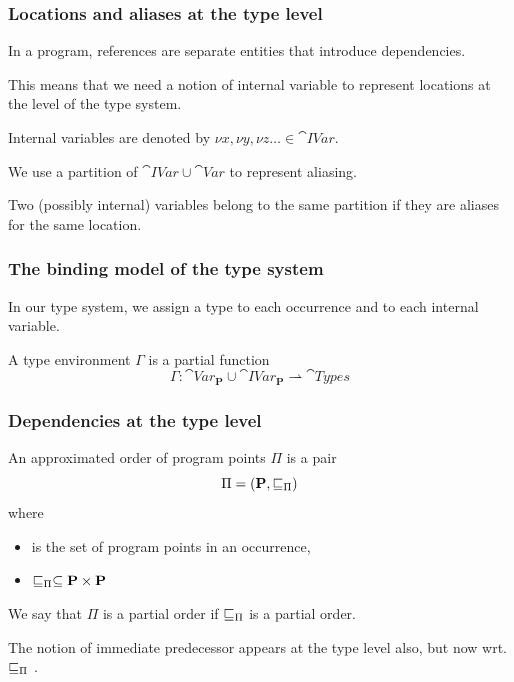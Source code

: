 \documentclass[aspectratio=169]{beamer}
\begin{document}
 \begin{frame}
   \frametitle{Locations and aliases at the type level}

In a program, references are separate entities that introduce
dependencies.

This means that we need a notion of \alert{internal variable} to
represent locations at the level of the type system.

Internal variables are denoted by
$\nu x,\nu y, \nu z \ldots \in\cat{IVar}$.

We use a partition of $\cat{IVar} \cup \cat{Var}$ to represent
aliasing.

Two (possibly internal) variables belong to the same partition if they are
aliases for the same location.


 \end{frame}
 
 \begin{frame}
   \frametitle{The binding model of the type system}

   In our type system, we assign a type to each occurrence and to each
   internal variable.

   A type environment $\Gamma$ is a partial function
   \[
     \Gamma:\cat{Var}_{\mathbf{P}}\cup\cat{IVar}_{\mathbf{P}}\rightharpoonup\cat{Types} \]
   
 \end{frame}

 \begin{frame}
   \frametitle{Dependencies at the type level}

	An approximated order of program points $\Pi$ is a pair
	\[ \Pi=(\textbf{P},\sqsubseteq_\Pi) \]
	where
	\begin{itemize}
		\item {} is the set of program points in an occurrence,
		\item $\sqsubseteq_\Pi\subseteq\textbf{P}\times\textbf{P}$
	\end{itemize}
	We say that $\Pi$ is a partial order if $\sqsubseteq_\Pi$ is a partial order.

        The notion of immediate predecessor appears at the type level also,
        but now wrt. $\sqsubseteq_\Pi$ .
        
      \end{frame}
\end{document}
